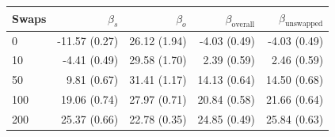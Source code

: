 \begin{table}[H]
\begin{tabular}{l rrrr}
\toprule
Swaps & $\beta_s$ & $\beta_o$ & $\beta_{\mathrm{overall}}$ & $\beta_{\mathrm{unswapped}}$ \\
\midrule
0 & -11.57 (0.27) & 26.12 (1.94) & -4.03 (0.49) & -4.03 (0.49) \\
10 & -4.41 (0.49) & 29.58 (1.70) & 2.39 (0.59) & 2.46 (0.59) \\
50 & 9.81 (0.67) & 31.41 (1.17) & 14.13 (0.64) & 14.50 (0.68) \\
100 & 19.06 (0.74) & 27.97 (0.71) & 20.84 (0.58) & 21.66 (0.64) \\
200 & 25.37 (0.66) & 22.78 (0.35) & 24.85 (0.49) & 25.84 (0.63) \\
\bottomrule
\end{tabular}
\end{table}

